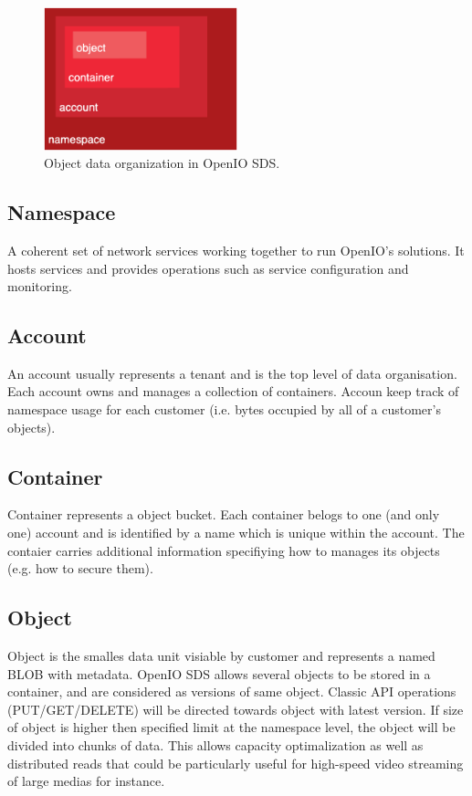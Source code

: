     \begin{figure}[hbt]
        \centering
        \includegraphics[width=0.5\textwidth]{obrazky-figures/openio-data-organization.eps}
        \caption{Object data organization in OpenIO SDS.\cite{oioArch}}
        \label{fig:oioDataOrganization}
    \end{figure}

    \subsection{Namespace}
    A coherent set of network services working together to run OpenIO’s solutions. It hosts services and provides operations such as service configuration and monitoring.

    \subsection{Account}
    An account usually represents a tenant and is the top level of data organisation. Each account owns and manages a collection of containers. Accoun keep track of namespace usage for each customer (i.e. bytes occupied by all of a customer's objects)\cite{oioCoreSolution}.

    \subsection{Container}
    Container represents a object bucket. Each container belogs to one (and only one) account and is identified by a name which is unique within the account. The contaier carries additional information specifiying how to manages its objects (e.g. how to secure them)\cite{oioCoreSolution}.

    \subsection{Object}
    Object is the smalles data unit visiable by customer and represents a named BLOB with metadata. OpenIO SDS allows several objects to be stored in a container, and are considered as versions of same object. Classic API operations (PUT/GET/DELETE) will be directed towards object with latest version. If size of object is higher then specified limit at the namespace level, the object will be divided into chunks of data. This allows capacity optimalization as well as distributed reads that could be particularly useful for high-speed video streaming of large medias for instance\cite{oioCoreSolution}.

